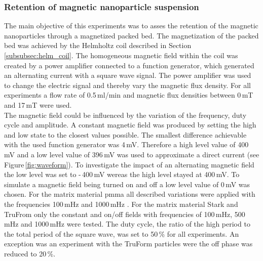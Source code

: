 \subsubsection{Retention of magnetic nanoparticle suspension}
\label{subsubsec:Ret_nanopart_method}
The main objective of this experiments was to asses the retention of the magnetic nanoparticles through a magnetized packed bed. The magnetization of the packed bed was achieved by the Helmholtz coil described in Section\,\ref{subsubsec:helm_coil}. The homogeneous magnetic field within the coil was created by a power amplifier connected to a function generator, which generated an alternating current with a square wave signal. The power amplifier was used to change the electric signal and thereby vary the magnetic flux density. For all experiments a flow rate of 0.5\,ml/min and magnetic flux densities between 0\,mT and 17\,mT were used. \\
The magnetic field could be influenced by the variation of the frequency, duty cycle and amplitude. A constant magnetic field was produced by setting the high and low state to the closest values possible. The smallest difference achievable with the used function generator was 4\,mV. Therefore a high level value of 400\,mV and a low level value of 396\,mV was used to approximate a direct current (see Figure\,\ref{fig:waveform}). To investigate the impact of an alternating magnetic field the low level was set to -\,400\,mV wereas the high level stayed at 400\,mV. To simulate a magnetic field being turned on and off a low level value of 0\,mV was chosen. For the matrix material \gls{pmma} all described variations were applied with the frequencies 100\,mHz and 1000\,mHz . For the matrix material Stark and TruFrom only the constant and on/off fields with frequencies of 100\,mHz, 500\,mHz and 1000\,mHz were tested. The duty cycle, the ratio of the high period to the total period of the square wave, was set to 50\,\% for all experiments. An exception was an experiment with the TruForm particles were the off phase was reduced to 20\,\%.

